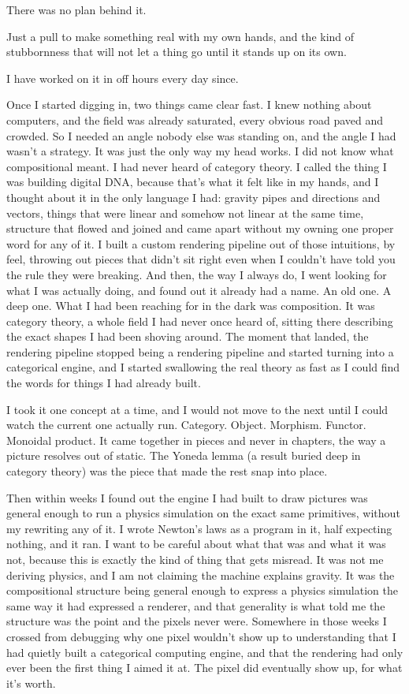\documentclass[11pt,twoside]{article}
\theoremstyle{thielethm}
\theoremstyle{thieledef}
\theoremstyle{thieledef}
\theoremstyle{thieledef}
\theoremstyle{thielethm}
\theoremstyle{thieleobs}
\theoremstyle{thielethm}
\begin{document}
There was no plan behind it.

Just a pull to make something real with my own hands, and the kind of stubbornness that will not let a thing go until it stands up on its own.

I have worked on it in off hours every day since.

Once I started digging in, two things came clear fast. I knew nothing about computers, and the field was already saturated, every obvious road paved and crowded. So I needed an angle nobody else was standing on, and the angle I had wasn't a strategy. It was just the only way my head works. I did not know what compositional meant. I had never heard of category theory. I called the thing I was building digital DNA, because that's what it felt like in my hands, and I thought about it in the only language I had: gravity pipes and directions and vectors, things that were linear and somehow not linear at the same time, structure that flowed and joined and came apart without my owning one proper word for any of it. I built a custom rendering pipeline out of those intuitions, by feel, throwing out pieces that didn't sit right even when I couldn't have told you the rule they were breaking. And then, the way I always do, I went looking for what I was actually doing, and found out it already had a name. An old one. A deep one. What I had been reaching for in the dark was composition. It was category theory, a whole field I had never once heard of, sitting there describing the exact shapes I had been shoving around. The moment that landed, the rendering pipeline stopped being a rendering pipeline and started turning into a categorical engine, and I started swallowing the real theory as fast as I could find the words for things I had already built.

I took it one concept at a time, and I would not move to the next until I could watch the current one actually run. Category. Object. Morphism. Functor. Monoidal product. It came together in pieces and never in chapters, the way a picture resolves out of static. The Yoneda lemma (a result buried deep in category theory) was the piece that made the rest snap into place.

Then within weeks I found out the engine I had built to draw pictures was general enough to run a physics simulation on the exact same primitives, without my rewriting any of it. I wrote Newton's laws as a program in it, half expecting nothing, and it ran. I want to be careful about what that was and what it was not, because this is exactly the kind of thing that gets misread. It was not me deriving physics, and I am not claiming the machine explains gravity. It was the compositional structure being general enough to express a physics simulation the same way it had expressed a renderer, and that generality is what told me the structure was the point and the pixels never were. Somewhere in those weeks I crossed from debugging why one pixel wouldn't show up to understanding that I had quietly built a categorical computing engine, and that the rendering had only ever been the first thing I aimed it at. The pixel did eventually show up, for what it's worth.
\end{document}
